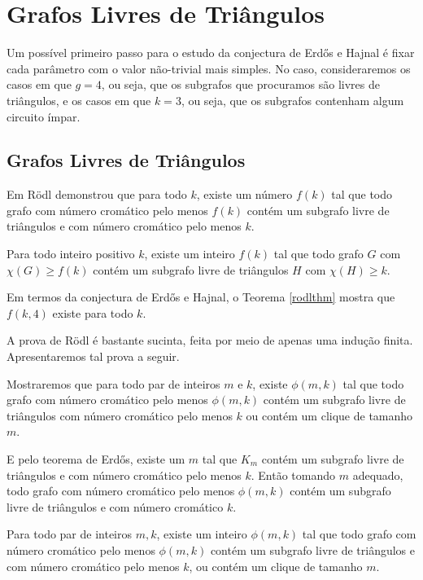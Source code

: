 \chapter{Grafos Livres de Triângulos}
\label{cap:livretriangulos}

Um possível primeiro passo para o estudo da conjectura de Erd\H{o}s e Hajnal é fixar cada parâmetro com o valor não-trivial mais simples. No caso, consideraremos os casos em que $g=4$, ou seja, que os subgrafos que procuramos são livres de triângulos, e os casos em que $k=3$, ou seja, que os subgrafos contenham algum circuito ímpar.

\section{Grafos Livres de Triângulos}

Em \cite{rodl1977chromatic} R\"{o}dl demonstrou que para todo $k$, existe um número $f(k)$ tal que todo grafo com número cromático pelo menos $f(k)$ contém um subgrafo livre de triângulos e com número cromático pelo menos $k$. 

\begin{teorema}\label{rodlthm}
Para todo inteiro positivo $k$, existe um inteiro $f(k)$ tal que todo grafo $G$ com $\chi(G) \geq f(k)$ contém um subgrafo livre de triângulos $H$ com $\chi(H) \geq k$.
\end{teorema}

Em termos da conjectura de Erd\H{o}s e Hajnal, o Teorema \ref{rodlthm} mostra que $f(k,4)$ existe para todo $k$.

A prova de R\"{o}dl é bastante sucinta, feita por meio de apenas uma indução finita. Apresentaremos tal prova a seguir.

Mostraremos que para todo par de inteiros $m$ e $k$, existe $\phi(m,k)$ tal que todo grafo com número cromático pelo menos $\phi(m,k)$ contém um subgrafo livre de triângulos com número cromático pelo menos $k$ ou contém um clique de tamanho $m$. 

E pelo teorema de Erd\H{o}s, existe um $m$ tal que $K_m$ contém um subgrafo livre de triângulos e com número cromático pelo menos $k$. Então tomando $m$ adequado, todo grafo com número cromático pelo menos $\phi(m,k)$ contém um subgrafo livre de triângulos e com número cromático $k$.

\begin{lema}\label{livretriangulolema1}
Para todo par de inteiros $m,k$, existe um inteiro $\phi(m,k)$ tal que todo grafo com número cromático pelo menos $\phi(m,k)$ contém um subgrafo livre de triângulos e com número cromático pelo menos $k$, ou contém um clique de tamanho $m$.
\end{lema}

